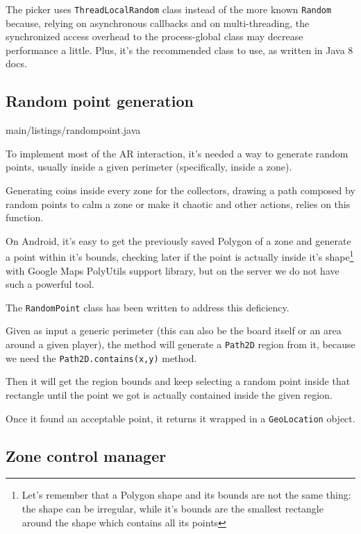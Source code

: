			The picker uses \lstinline|ThreadLocalRandom| class instead of the more known \lstinline|Random| because, relying on asynchronous callbacks and on multi-threading, the synchronized access overhead to the process-global class may decrease performance a little.
			Plus, it's the recommended class to use, as written in Java 8 docs.
						
		\subsection{Random point generation}\label{focus:point}
		
			
							{main/listings/randompoint.java}
			
			To implement most of the AR interaction, it's needed a way to generate random points, usually inside a given perimeter (specifically, inside a zone).
			
			Generating coins inside every zone for the collectors, drawing a path composed by random points to calm a zone or make it chaotic and other actions, relies on this function.
			
			On Android, it's easy to get the previously saved Polygon of a zone and generate a point within it's bounds, checking later if the point is actually inside it's shape\footnote{Let's remember that a Polygon shape and its bounds are not the same thing: the shape can be irregular, while it's bounds are the smallest rectangle around the shape which contains all its points} with Google Maps PolyUtils support library, but on the server we do not have such a powerful tool.
			
			The \lstinline|RandomPoint| class has been written to address this deficiency.
			
			Given as input a generic perimeter (this can also be the board itself or an area around a given player), the method will generate a \lstinline|Path2D| region from it, because we need the \lstinline|Path2D.contains(x,y)| method.
			
			Then it will get the region bounds and keep selecting a random point inside that rectangle until the point we got is actually contained inside the given region.
			
			Once it found an acceptable point, it returns it wrapped in a \lstinline|GeoLocation| object.
		
		\subsection{Zone control manager}\label{focus:control}
		
